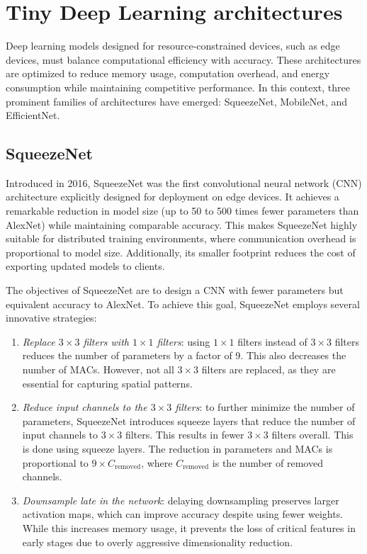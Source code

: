 \section{Tiny Deep Learning architectures}

Deep learning models designed for resource-constrained devices, such as edge devices, must balance computational efficiency with accuracy.
These architectures are optimized to reduce memory usage, computation overhead, and energy consumption while maintaining competitive performance.
In this context, three prominent families of architectures have emerged: SqueezeNet, MobileNet, and EfficientNet.

\subsection{SqueezeNet}
Introduced in 2016, SqueezeNet was the first convolutional neural network (CNN) architecture explicitly designed for deployment on edge devices.
It achieves a remarkable reduction in model size (up to 50 to 500 times fewer parameters than AlexNet) while maintaining comparable accuracy.
This makes SqueezeNet highly suitable for distributed training environments, where communication overhead is proportional to model size.
Additionally, its smaller footprint reduces the cost of exporting updated models to clients.

The objectives of SqueezeNet are to design a CNN with fewer parameters but equivalent accuracy to AlexNet.
To achieve this goal, SqueezeNet employs several innovative strategies:
\begin{enumerate}
    \item \textit{Replace $3\times 3$ filters with $1\times 1$ filters}: using $1\times 1$ filters instead of $3\times 3$ filters reduces the number of parameters by a factor of 9. 
        This also decreases the number of MACs. 
        However, not all $3\times 3$ filters are replaced, as they are essential for capturing spatial patterns.
    \item \textit{Reduce input channels to the $3\times 3$ filters}: to further minimize the number of parameters, SqueezeNet introduces squeeze layers that reduce the number of input channels to $3\times 3$ filters. 
        This results in fewer $3\times 3$ filters overall. 
        This is done using squeeze layers. 
        The reduction in parameters and MACs is proportional to $9\times C_{\text{removed}}$, where $C_{\text{removed}}$ is the number of removed channels.
    \item \textit{Downsample late in the network}: delaying downsampling preserves larger activation maps, which can improve accuracy despite using fewer weights.
        While this increases memory usage, it prevents the loss of critical features in early stages due to overly aggressive dimensionality reduction.
\end{enumerate}


